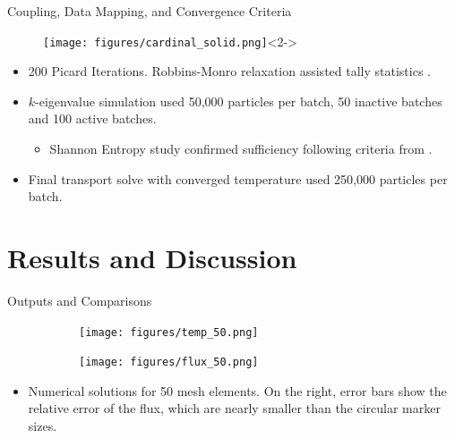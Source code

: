 \documentclass[9pt,t]{beamer}
\begin{document}
\begin{frame}{Coupling, Data Mapping, and Convergence Criteria}
    \pause
    \begin{figure}[T]
        \centering
        \texttt{[image: figures/cardinal\_solid.png]}<2->
    \end{figure}
    \begin{itemize}
        \item <3-> 200 Picard Iterations. Robbins-Monro relaxation assisted tally statistics \cite{dufek}.
        \item <4-> $k$-eigenvalue simulation used 50,000 particles per batch, 50 inactive batches and 100 active batches.
        \begin{itemize}
            \item <5-> Shannon Entropy study confirmed sufficiency following criteria from \cite{brown-entropy-2006}.
        \end{itemize}
        \item <6-> Final transport solve with converged temperature used 250,000 particles per batch.
    \end{itemize}
\end{frame}


\section{Results and Discussion}
\begin{frame}{Outputs and Comparisons}
    \pause
    \begin{figure}[T]
        \hspace*{-1cm}
        \begin{subfigure}[b]{0.495\linewidth}
            \centering
            \texttt{[image: figures/temp\_50.png]}
        \end{subfigure}\hspace*{0.6cm}
        \begin{subfigure}[b]{0.495\linewidth}
        \centering
            \texttt{[image: figures/flux\_50.png]}
        \end{subfigure}
    \end{figure}
    \begin{itemize}
        \item Numerical solutions for 50 mesh elements. On the right, error bars show the relative error of the flux, which are nearly smaller than the circular marker sizes.
    \end{itemize}
\end{frame}
\end{document}
